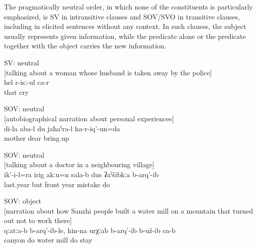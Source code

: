 The pragmatically neutral order, in which none of the constituents is particularly emphasized, is SV in intransitive clauses and SOV/SVO in transitive clauses, including in elicited sentences without any context. In such clauses, the subject usually represents given information, while the predicate alone or the predicate together with the object carries the new information.
%
\begin{exe}
	\ex	SV: neutral \\\label{ex:She is crying SV}%
		[talking about a woman whose husband is taken away by the police]\\
	\gll	hel	r-isː-ul	ca-r\\
		that cry	\\
	\glt	{}

	\ex	SOV: neutral \\	\label{ex:‎My mother protected me (kept me dear) SOV}
		[autobiographical narration about personal experiences]\\
	\gll	di-la	aba-l	du	jaħaˁra-l ha-r-iq'-un=da\\
			mother		dear	bring.up\\
	\glt	{}

	\ex	SOV: neutral \\	\label{ex:But he also, not in the last year but two years ago, made a mistake SOV}
		[talking about a doctor in a neighbouring village]\\
	\gll	ik'-i-l=ra	irig	akːu=n	sala-b	dus	ʡaˁšibkːa	b-arq'-ib\\
			last.year	but	front	year	mistake	do\\
	\glt	{}

	\ex	SOV: object \\				\label{ex:(They) built it in the canyon, (they) apparently built a water mill SOV}
		[narration about how Sanzhi people built a water mill on a mountain that turned out not to work there]\\
	\gll	qːatːa-b	b-arq'-ib-le,	hin-na	urχːab	b-arq'-ib	b-už-ib	ca-b\\
		canyon	do	water	mill	do	stay \\
	\glt	{}


\end{exe}
